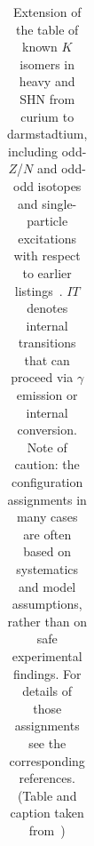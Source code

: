 \onecolumn
\begin{center}
\begin{longtable}{lcccccl}



\caption
{
Extension of the table of known $K$ isomers in heavy and SHN from curium to darmstadtium, including odd-$Z$/$N$ and odd-odd isotopes and single-particle excitations with respect to earlier listings~\cite{Herzberg2008, Ackermann2015b}. $IT$ denotes internal transitions that can proceed via $\gamma$ emission or internal conversion. Note of caution: the configuration assignments in many cases are often based on systematics and model assumptions, rather than on safe experimental findings. For details of those assignments see the corresponding references. (Table and caption taken from~\cite{Ackermann2024}\label{tab:K-isomers})
}


\end{longtable}
\end{center}
